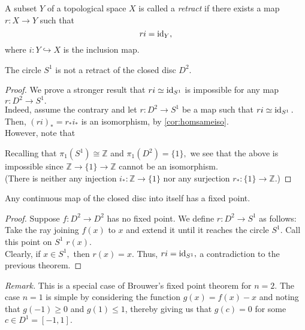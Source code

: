 \documentclass[12pt]{article}
\begin{document}
\begin{defn}[Retract]
	A subset $Y$ of a topological space $X$ is called a \emph{retract} if there exists a map $r:X \to Y$ such that
	\begin{equation*} 
		ri = \operatorname{id}_Y,
	\end{equation*}
	where $i:Y \hookrightarrow X$ is the inclusion map.
\end{defn}
\begin{thm} \label{thm:S1notretractofD2}
	The circle $S^1$ is not a retract of the closed disc $D^2.$
\end{thm}
\begin{proof} 
	We prove a stronger result that $ri \simeq \operatorname{id}_{S^1}$ is impossible for any map $r:D^2 \to S^1.$\\
	Indeed, assume the contrary and let $r:D^2 \to S^1$ be a map such that $ri \simeq \operatorname{id}_{S^1}.$ Then, $(ri)_* = r_*i_*$ is an isomorphism, by \cref{cor:homsameiso}.\\
	However, note that 
	\begin{center}
	\end{center}
	Recalling that $\pi_1(S^1) \cong \mathbb{Z}$ and $\pi_1(D^2) = \{1\},$ we see that the above is impossible since $\mathbb{Z} \to \{1\} \to \mathbb{Z}$ cannot be an isomorphism. \\
	(There is neither any injection $i_* : \mathbb{Z} \to \{1\}$ nor any surjection $r_* : \{1\} \to \mathbb{Z}.$)
\end{proof}
\begin{cor} \label{cor:specialbrouwer}
	Any continuous map of the closed disc into itself has a fixed point.
\end{cor}
\begin{proof} 
	Suppose $f:D^2 \to D^2$ has no fixed point. We define $r:D^2 \to S^1$ as follows:\\
	Take the ray joining $f(x)$ to $x$ and extend it until it reaches the circle $S^1.$ Call this point on $S^1$ $r(x).$\\
	Clearly, if $x \in S^1,$ then $r(x) = x.$ Thus, $ri = \operatorname{id}_{S^1},$ a contradiction to the previous theorem.
\end{proof}
\emph{Remark.} This is a special case of Brouwer's fixed point theorem for $n = 2.$ The case $n = 1$ is simple by considering the function $g(x) = f(x) - x$ and noting that $g(-1) \ge 0$ and $g(1) \le 1$, thereby giving us that $g(c) = 0$ for some $c \in D^1 = [-1, 1].$
\end{document}
